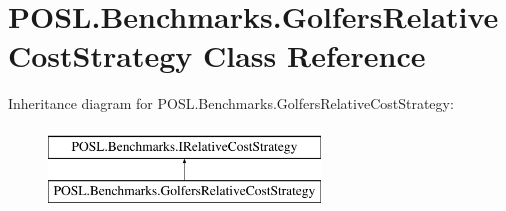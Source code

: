 \hypertarget{classPOSL_1_1Benchmarks_1_1GolfersRelativeCostStrategy}{}\section{P\+O\+S\+L.\+Benchmarks.\+Golfers\+Relative\+Cost\+Strategy Class Reference}
\label{classPOSL_1_1Benchmarks_1_1GolfersRelativeCostStrategy}
Inheritance diagram for P\+O\+S\+L.\+Benchmarks.\+Golfers\+Relative\+Cost\+Strategy\+:\begin{figure}[H]
\begin{center}
\leavevmode
\includegraphics[height=2.000000cm]{classPOSL_1_1Benchmarks_1_1GolfersRelativeCostStrategy}
\end{center}
\end{figure}
